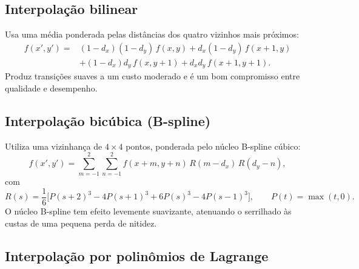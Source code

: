 \documentclass[12pt,a4paper]{article}
\begin{document}
\subsection{Interpolação bilinear}

Usa uma média ponderada pelas distâncias dos quatro vizinhos mais próximos:
\begin{equation}
  \begin{aligned}
    f(x', y') ={}& (1 - d_x)(1 - d_y)\, f(x, y) + d_x (1 - d_y)\, f(x{+}1, y) \\
    &+ (1 - d_x) d_y\, f(x, y{+}1) + d_x d_y\, f(x{+}1, y{+}1).
  \end{aligned}
  \label{eq:bilinear}
\end{equation}
Produz transições suaves a um custo moderado e é um bom compromisso entre
qualidade e desempenho.

\subsection{Interpolação bicúbica (B-spline)}

Utiliza uma vizinhança de $4 \times 4$ pontos, ponderada pelo núcleo B-spline
cúbico:
\begin{equation}
  f(x', y') = \sum_{m=-1}^{2} \sum_{n=-1}^{2}
    f(x{+}m, y{+}n)\, R(m - d_x)\, R(d_y - n),
  \label{eq:bicubica}
\end{equation}
com
\begin{equation}
  R(s) = \frac{1}{6}\Big[ P(s{+}2)^3 - 4P(s{+}1)^3 + 6P(s)^3 - 4P(s{-}1)^3 \Big],
  \qquad
  P(t) = \max(t, 0).
  \label{eq:bspline}
\end{equation}
O núcleo B-spline tem efeito levemente suavizante, atenuando o serrilhado às
custas de uma pequena perda de nitidez.

\subsection{Interpolação por polinômios de Lagrange}
\end{document}
